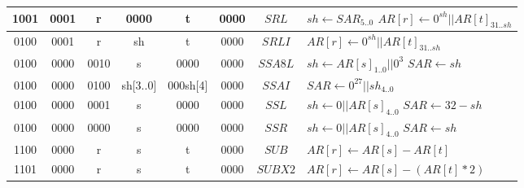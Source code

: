 \begin{smalltables}
\begin{longtable}{llllllllllllllllllllllll  p{1cm}  p{6cm} | }
        \multicolumn{4}{|c|}{1001} & \multicolumn{4}{c|}{0001} & \multicolumn{4}{c|}{r} & \multicolumn{4}{c|}{0000} & \multicolumn{4}{c|}{t} & \multicolumn{4}{c|}{0000} & \multicolumn{1}{c|}{$SRL$} & $sh \leftarrow SAR_{5..0}$ \newline $AR[r] \leftarrow 0^{sh} || AR[t]_{31..sh}$ \\ \hline        
        \multicolumn{4}{|c|}{0100} & \multicolumn{4}{c|}{0001} & \multicolumn{4}{c|}{r} & \multicolumn{4}{c|}{sh} & \multicolumn{4}{c|}{t} & \multicolumn{4}{c|}{0000} & \multicolumn{1}{c|}{$SRLI$} & $AR[r] \leftarrow 0^{sh} || AR[t]_{31..sh}$ \\ \hline
        \multicolumn{4}{|c|}{0100} & \multicolumn{4}{c|}{0000} & \multicolumn{4}{c|}{0010} & \multicolumn{4}{c|}{s} & \multicolumn{4}{c|}{0000} & \multicolumn{4}{c|}{0000} & \multicolumn{1}{c|}{$SSA8L$} & $sh \leftarrow AR[s]_{1..0} || 0^3$ \newline $SAR \leftarrow sh$ \\ \hline
        \multicolumn{4}{|c|}{0100} & \multicolumn{4}{c|}{0000} & \multicolumn{4}{c|}{0100} & \multicolumn{4}{c|}{sh[3..0]} & \multicolumn{4}{c|}{000sh[4]} & \multicolumn{4}{c|}{0000} & \multicolumn{1}{c|}{$SSAI$} & $SAR \leftarrow 0^{27} || sh_{4..0}$ \\ \hline
        \multicolumn{4}{|c|}{0100} & \multicolumn{4}{c|}{0000} & \multicolumn{4}{c|}{0001} & \multicolumn{4}{c|}{s} & \multicolumn{4}{c|}{0000} & \multicolumn{4}{c|}{0000} & \multicolumn{1}{c|}{$SSL$} & $sh \leftarrow 0 || AR[s]_{4..0}$ \newline $SAR \leftarrow 32 - sh$ \\ \hline
        \multicolumn{4}{|c|}{0100} & \multicolumn{4}{c|}{0000} & \multicolumn{4}{c|}{0000} & \multicolumn{4}{c|}{s} & \multicolumn{4}{c|}{0000} & \multicolumn{4}{c|}{0000} & \multicolumn{1}{c|}{$SSR$} & $sh \leftarrow 0 || AR[s]_{4..0}$ \newline $SAR \leftarrow sh$ \\ \hline
		\multicolumn{4}{|c|}{1100} & \multicolumn{4}{c|}{0000} & \multicolumn{4}{c|}{r} & \multicolumn{4}{c|}{s} & \multicolumn{4}{c|}{t} & \multicolumn{4}{c|}{0000} & \multicolumn{1}{c|}{$SUB$} & $AR[r] \leftarrow AR[s] - AR[t]$ \\ \hline        
		\multicolumn{4}{|c|}{1101} & \multicolumn{4}{c|}{0000} & \multicolumn{4}{c|}{r} & \multicolumn{4}{c|}{s} & \multicolumn{4}{c|}{t} & \multicolumn{4}{c|}{0000} & \multicolumn{1}{c|}{$SUBX2$} & $AR[r] \leftarrow AR[s] - (AR[t]*2)$ \\ \hline        

\end{longtable}
\end{smalltables}
